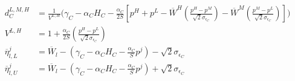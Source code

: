\documentclass[12pt]{article}
\begin{document}
\begin{align}
\begin{split}
d^{L,M,H}_C       		&= \frac{ 1}{ V^{L,H} } \Big ( \gamma_C - \alpha_C H_{C} - \frac{\alpha_C}{2 S}  [ p^{H} + p^{L} - \overline{W}^{H} (\frac{p^{H} - p^{M}}{\sqrt{2}{\sigma_{\epsilon_C}}})  - \overline{W}^{M} (\frac{p^{M} - p^{L}}{\sqrt{2}{\sigma_{\epsilon_C}}})  ]  \Big )    \\
V^{L,H} 	     	    &=   1 + \frac{\alpha_C}{2 S} ( \frac{p^{H} - p^{L}}{\sqrt{2}\sigma_{\epsilon_C}})   \\
\overline{\eta}^{j}_{l,L}   &= \overline{W}_l - ( \gamma_C - \alpha_C H_{C} -   \frac{\alpha_C}{S} p^j ) - \sqrt{2} \sigma_{\epsilon_C} \\
\overline{\eta}^{j}_{l,U}   &= \overline{W}_l - ( \gamma_C - \alpha_C H_{C} -   \frac{\alpha_C}{S} p^j ) + \sqrt{2} \sigma_{\epsilon_C} \\
\end{split}
\end{align}
\end{document}
